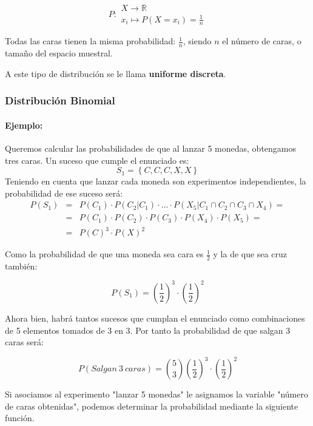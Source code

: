 $$P\colon \begin{array}{ll} 
          X \rightarrow \mathbb{R} \\ 
          x_i\mapsto P(X=x_i)=\frac{1}{n} 
         \end{array}$$

Todas las caras tienen la misma probabilidad: $\frac{1}{n}$, siendo $n$ el número de caras, o tamaño del espacio muestral. 

A este tipo de distribución se le llama \textbf{uniforme discreta}.

\subsubsection{Distribución Binomial}

\paragraph{Ejemplo:} Queremos calcular las probabilidades de que al lanzar 5 monedas, obtengamos tres caras.
Un suceso que cumple el enunciado es:
$$S_1=\left\lbrace C,C,C,X,X \right\rbrace$$
Teniendo en cuenta que lanzar cada moneda son experimentos independientes, la probabilidad de ese suceso será:
\begin{eqnarray*}
P\left(S_1\right) & = &P\left(C_1\right)\cdot P\left(C_2 | C_1 \right)\cdot ... \cdot P\left(X_5 | C_1 \cap C_2  \cap C_3  \cap X_4   \right)= \\ &  = & P\left(C_1\right)\cdot  P\left(C_2\right) \cdot P\left(C_3\right) \cdot P\left(X_4\right) \cdot P\left(X_5\right)= \\
& = & P\left(C\right)^3\cdot  P\left(X\right)^2
\end{eqnarray*}

Como la probabilidad de que una moneda sea cara es $\frac{1}{2}$ y la de que sea cruz también:

$$P\left(S_1\right)=\left(\frac{1}{2}\right)^3\cdot  \left(\frac{1}{2}\right)^2$$

Ahora bien, habrá tantos sucesos que cumplan el enunciado como combinaciones de 5 elementos tomados de 3 en 3. Por tanto la probabilidad de que salgan 3 caras será:

$$P\left(Salgan \ 3 \ caras\right)=\binom{5}{3}\left(\frac{1}{2}\right)^3\cdot  \left(\frac{1}{2}\right)^2$$

Si asociamos al experimento "lanzar 5 monedas" le asignamos la variable "número de caras obtenidas", podemos determinar la probabilidad mediante la siguiente función.

